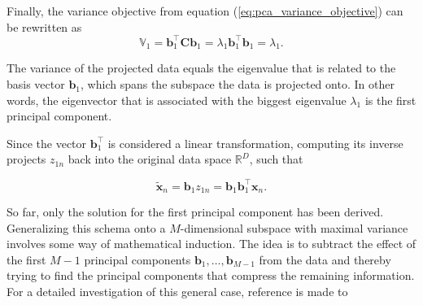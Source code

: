 \documentclass[../../../main.tex]{subfiles}
\begin{document}
Finally, the variance objective from equation (\ref{eq:pca_variance_objective}) can be rewritten as 
\begin{equation}
    \mathbb{V}_1 = \bm{b}_1^\top \bm{C} \bm{b}_1 = \lambda_1 \bm{b}_1^\top \bm{b}_1 = \lambda_1. 
\end{equation}

The variance of the projected data equals the eigenvalue that is related to the basis vector $\bm{b}_1$, which spans the subspace the data is projected onto. In other words, the eigenvector that is associated with the biggest eigenvalue $\lambda_1$ is the first principal component.

Since the vector $\bm{b}_1^\top$ is considered a linear transformation, computing its inverse projects $z_{1n}$ back into the original data space $\mathbb{R}^D$, such that

\begin{equation*}
    \tilde{\bm{x}}_n = \bm{b}_1z_{1n} = \bm{b}_1 \bm{b}_1^\top \bm{x}_n.
\end{equation*}

So far, only the solution for the first principal component has been derived. Generalizing this schema onto a $M$-dimensional subspace with maximal variance involves some way of mathematical induction. The idea is to subtract the effect of the first $M-1$ principal components $\bm{b}_1, \dots, \bm{b}_{M-1}$ from the data and thereby trying to find the principal components that compress the remaining information. For a detailed investigation of this general case, reference is made to \cite[pp.291]{dei_2020}
\end{document}

